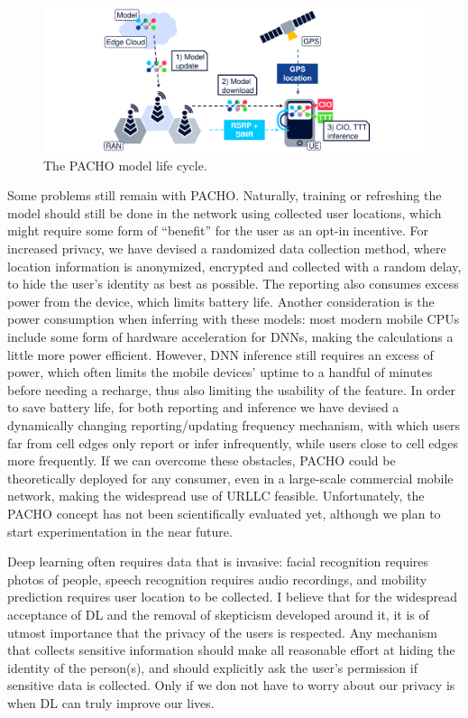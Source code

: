 		\begin{figure}[ht]
			\centering
			\includegraphics[width=\columnwidth]{figures/10_pred_control/pred_control_pacho/pacho.pdf}
			\caption[The PACHO model life cycle]{The PACHO model life cycle.}
			\label{fig:pred_control_pacho}
		\end{figure}
		
		Some problems still remain with \ac{PACHO}.
		Naturally, training or refreshing the model should still be done in the network using collected user locations, which might require some form of ``benefit'' for the user as an opt-in incentive.
		For increased privacy, we have devised a randomized data collection method, where location information is anonymized, encrypted and collected with a random delay, to hide the user's identity as best as possible.
		The reporting also consumes excess power from the device, which limits battery life.
		Another consideration is the power consumption when inferring with these models: most modern mobile \acp{CPU} include some form of hardware acceleration for \acp{DNN}, making the calculations a little more power efficient.
		However, \ac{DNN} inference still requires an excess of power, which often limits the mobile devices' uptime to a handful of minutes before needing a recharge, thus also limiting the usability of the feature.
		In order to save battery life, for both reporting and inference we have devised a dynamically changing reporting/updating frequency mechanism, with which users far from cell edges only report or infer infrequently, while users close to cell edges more frequently.
		If we can overcome these obstacles, \ac{PACHO} could be theoretically deployed for any consumer, even in a large-scale commercial mobile network, making the widespread use of \ac{URLLC} feasible.
		Unfortunately, the \ac{PACHO} concept has not been scientifically evaluated yet, although we plan to start experimentation in the near future.

		Deep learning often requires data that is invasive: facial recognition requires photos of people, speech recognition requires audio recordings, and mobility prediction requires user location to be collected.
		I believe that for the widespread acceptance of \ac{DL} and the removal of skepticism developed around it, it is of utmost importance that the privacy of the users is respected.
		Any mechanism that collects sensitive information should make all reasonable effort at hiding the identity of the person(s), and should explicitly ask the user's permission if sensitive data is collected.
		Only if we don not have to worry about our privacy is when \ac{DL} can truly improve our lives.

